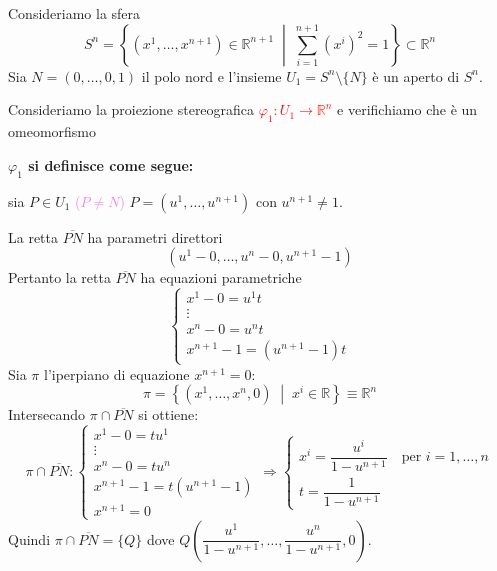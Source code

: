        \begin{esempio}
        \mbox{}

        Consideriamo la sfera
        \[
        S^n = \left\{ (x^1, \dots, x^{n+1}) \in \mathbb{R}^{n+1} \;\middle|\; \sum_{i=1}^{n+1} (x^i)^2 = 1 \right\} \subset \mathbb{R}^n
        \]
        Sia $N = (0, \dots, 0, 1)$ il polo nord e l'insieme \textcolor{verde}{$U_1 = S^n \setminus \{N\}$} è un aperto di $S^n$. 

        Consideriamo la proiezione stereografica
        \textcolor{red}{$\varphi_1 : U_1 \to \mathbb{R}^n$}
        e verifichiamo che è un omeomorfismo

        \textbf{$\varphi_1$ si definisce come segue:} 
        
        sia $P \in U_1$ \textcolor{violet}{($P \neq N$)} $P = (u^1, \dots, u^{n+1})$ con $u^{n+1} \neq 1$.
        
        La retta $\overline{PN}$ ha parametri direttori
        \[
        (u^1 - 0, \dots, u^n - 0, u^{n+1} - 1)
        \]
        Pertanto la retta $\overline{PN}$ ha equazioni parametriche
        \[
        \begin{cases}
        x^1 -0 = u^1 t \\
        \vdots \\
        x^n -0 = u^n t \\
        x^{n+1} - 1 = (u^{n+1} - 1)t
        \end{cases}
        \]
        Sia $\pi$ l'iperpiano di equazione $x^{n+1} = 0$:
        \[
        \pi = \left\{ (x^1, \dots, x^n, 0) \;\middle|\; x^i \in \mathbb{R} \right\} \equiv \mathbb{R}^n
        \]
        Intersecando $\pi \cap \overline{PN}$ si ottiene:
        \[ \pi \cap \overline{PN} \colon
        \begin{cases*}
        x^1 - 0 = t u^1 \\
        \vdots \\
        x^n - 0 = t u^n  \\
        x^{n+1} -1 = t(u^{n+1}-1) \\
        x^{n+1} =0
        \end{cases*} \Rightarrow
        \begin{cases}
        x^i = \dfrac{u^i}{1 - u^{n+1}} \quad \text{per } i = 1, \dots, n \\[2ex]
        t = \dfrac{1}{1 - u^{n+1}}
        \end{cases}
        \]
        Quindi $\pi \cap \overline{PN} = \{Q\}$ dove $Q\left( \dfrac{u^1}{1 - u^{n+1}}, \dots, \dfrac{u^n}{1 - u^{n+1}}, 0 \right)$.
        

\end{esempio}
